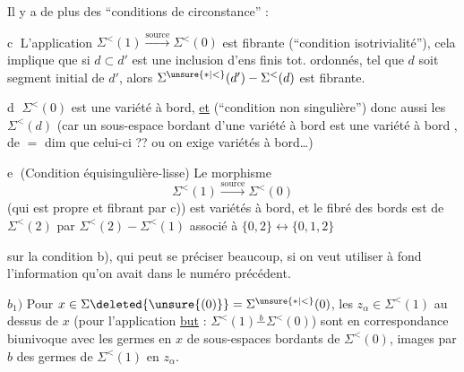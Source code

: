 Il y a de plus des ``conditions de circonstance'' :

\textcircled{c} L'application $\Sigma^{<}(1)\xrightarrow{\mathrm{source}}\Sigma^{<}(0)$ est  fibrante (``condition isotrivialité''), cela implique que  si $d\subset d'$ est une inclusion d'ens finis tot. ordonnés, tel que $d$ soit segment initial de $d'$, alors $\Sigma^{\unsure{*|<}}(d')-\Sigma^{<}(d)$ est fibrante.

\textcircled{d}  $\Sigma^{<}(0)$ est  une variété à bord, \uline{et}  (``condition non singulière'') donc aussi les $\Sigma^{<}(d)$ (car un sous-espace bordant d'une variété à bord est une variété à bord  , de $=$ dim que celui-ci ?? \unsure{\}} ou on exige   variétés à bord\ldots)

\textcircled{e} (Condition   équisingulière-lisse)
 Le morphisme
\[
\Sigma^{<}(1)\xrightarrow{\mathrm{source}}\Sigma^{<}(0)
\]
(qui est propre et fibrant par c))  est  variétés à bord, et le fibré des bords est   de $\Sigma^{<}(2)$ par $\Sigma^{<}(2)-\Sigma^{<}(1)$ associé à $\{0,2\}\longleftrightarrow\{0,1,2\}$

 sur la condition b), qui peut se préciser beaucoup, si on veut utiliser à fond l'information qu'on avait dans le numéro précédent.

$b_1)$ Pour $x\in\Sigma\deleted{\unsure{(0)}}=\Sigma^{\unsure{*|<}}(0)$, les $z_\alpha\in\Sigma^{<}(1)$ au dessus de $x$ (pour l'application \uline{but} : $\Sigma^{<}(1)\overset{b}{-}\Sigma^{<}(0)$) sont en correspondance biunivoque avec les germes  en $x$ de sous-espaces bordants de $\Sigma^{<}(0)$,  images par $b$ des germes de $\Sigma^{<}(1)$ en  $z_\alpha$.

